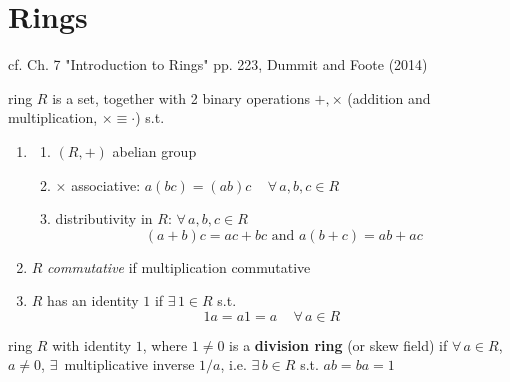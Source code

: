 \section{Rings} 

cf. Ch. 7 "Introduction to Rings" pp. 223, Dummit and Foote (2014)\cite{agat:DuFo2003}

\begin{definition}[Ring]
ring $R$ is a set, together with 2 binary operations $+, \times $ (addition and multiplication, $\times \equiv \cdot $) s.t. 
\begin{enumerate} 
\item \begin{enumerate}
	\item $(R, +)$ abelian group 
	\item $\times $ associative: $a(bc) = (ab)c \quad \, \forall \, a, b, c \in R$  
	\item distributivity in $R$: $\forall \, a , b, c \in R$ 
	\[
	(a+b)c = ac + bc \text{ and } a(b+c) = ab + ac
	\]
\end{enumerate}	
\item $R$ \emph{commutative} if multiplication commutative
\item $R$ has an identity $1$ if $\exists \, 1 \in R$ s.t.
\[
1a = a1 = a \quad \, \forall \, a \in R
\]
\end{enumerate}
\end{definition}

\begin{definition}
	ring $R$ with identity $1$, where $1\neq 0$ is a \textbf{division ring} (or skew field) if $\forall \, a \in R$, $a\neq 0$, $\exists \, $ multiplicative inverse $1/a$, i.e. $\exists \, b\in R$ s.t. $ab=ba = 1$
\end{definition}

